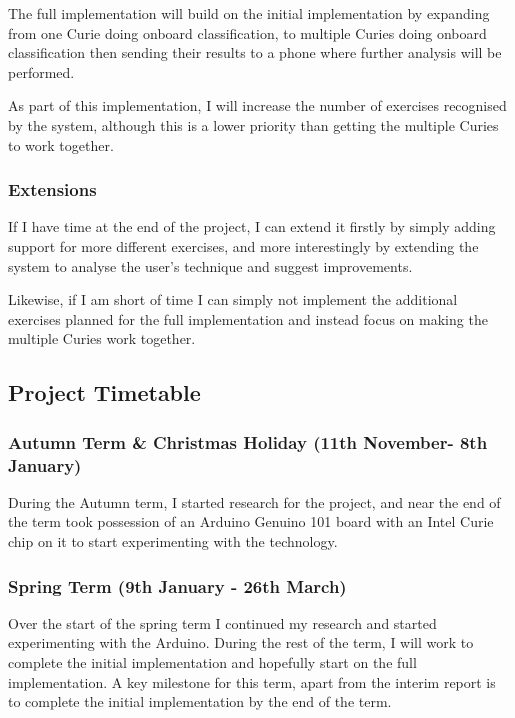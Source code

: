 \documentclass[a4paper]{article}
\begin{document}
The full implementation will build on the initial implementation by expanding from one Curie doing onboard classification, to multiple Curies doing onboard classification then sending their results to a phone where further analysis will be performed. 

As part of this implementation, I will increase the number of exercises recognised by the system, although this is a lower priority than getting the multiple Curies to work together.

\subsubsection{Extensions}

If I have time at the end of the project, I can extend it firstly by simply adding support for more different exercises, and more interestingly by extending the system to analyse the user's technique and suggest improvements.

Likewise, if I am short of time I can simply not implement the additional exercises planned for the full implementation and instead focus on making the multiple Curies work together.

\newpage
\subsection{Project Timetable}%

\subsubsection{Autumn Term \& Christmas Holiday (11th November- 8th January)}

During the Autumn term, I started research for the project, and near the end of the term took possession of an Arduino Genuino 101 board with an Intel Curie chip on it to start experimenting with the technology.

\subsubsection{Spring Term (9th January - 26th March)}

Over the start of the spring term I continued my research and started experimenting with the Arduino. During the rest of the term, I will work to complete the initial implementation and hopefully start on the full implementation. A key milestone for this term, apart from the interim report is to complete the initial implementation by the end of the term.
\end{document}
